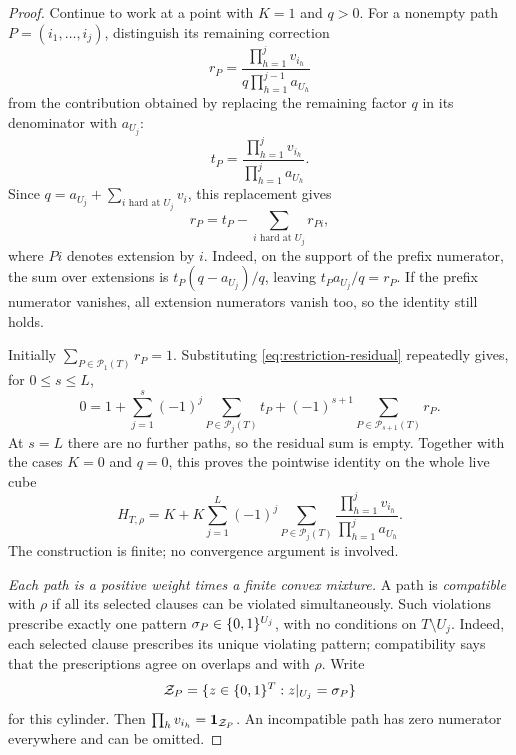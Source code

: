 \begin{proof}
Continue to work at a point with $K=1$ and $q>0$.  For a nonempty path
$P=(i_1,\ldots,i_j)$, distinguish its remaining correction
\[
  r_P=\frac{\prod_{h=1}^{j}v_{i_h}}
             {q\prod_{h=1}^{j-1}a_{U_h}}
\]
from the contribution obtained by replacing the remaining factor $q$
in its denominator with $a_{U_j}$:
\[
  t_P=\frac{\prod_{h=1}^{j}v_{i_h}}
             {\prod_{h=1}^{j}a_{U_h}}.
\]
Since $q=a_{U_j}+\sum_{i\text{ hard at }U_j}v_i$, this replacement gives
\begin{equation}\label{eq:restriction-residual}
  r_P=t_P-\sum_{i\text{ hard at }U_j}r_{Pi},
\end{equation}
where $Pi$ denotes extension by $i$.  Indeed, on the support of the
prefix numerator, the sum over extensions is
$t_P(q-a_{U_j})/q$, leaving $t_Pa_{U_j}/q=r_P$.
If the prefix numerator vanishes, all extension numerators vanish too,
so the identity still holds.

Initially $\sum_{P\in\mathcal P_1(T)}r_P=1$.  Substituting
\eqref{eq:restriction-residual} repeatedly gives, for $0\leq s\leq L$,
\[
  0=1+\sum_{j=1}^{s}(-1)^j\sum_{P\in\mathcal P_j(T)}t_P
       +(-1)^{s+1}\sum_{P\in\mathcal P_{s+1}(T)}r_P.
\]
At $s=L$ there are no further paths, so the residual sum is empty.
Together with the cases $K=0$ and $q=0$, this proves the pointwise identity
on the whole live cube
\begin{equation}\label{eq:restriction-expansion}
 H_{T,\rho}
   =K+K\sum_{j=1}^{L}(-1)^j
          \sum_{P\in\mathcal P_j(T)}
          \frac{\prod_{h=1}^{j}v_{i_h}}
               {\prod_{h=1}^{j}a_{U_h}}.
\end{equation}
The construction is finite; no convergence argument is involved.

\medskip\noindent
\textit{Each path is a positive weight times a finite convex mixture.}
A path is \emph{compatible} with $\rho$ if all its selected clauses can
be violated simultaneously.  Such violations prescribe exactly one
pattern $\sigma_P\in\{0,1\}^{U_j}$, with no conditions on $T\setminus U_j$.
Indeed, each selected clause prescribes its unique violating pattern;
compatibility says that the prescriptions agree on overlaps and with
$\rho$.  Write
\[
  \mathcal Z_P=\{z\in\{0,1\}^T:z|_{U_j}=\sigma_P\}
\]
for this cylinder.  Then $\prod_hv_{i_h}=\mathbf 1_{\mathcal Z_P}$.  An
incompatible path has zero numerator everywhere and can be omitted.


\end{proof}
